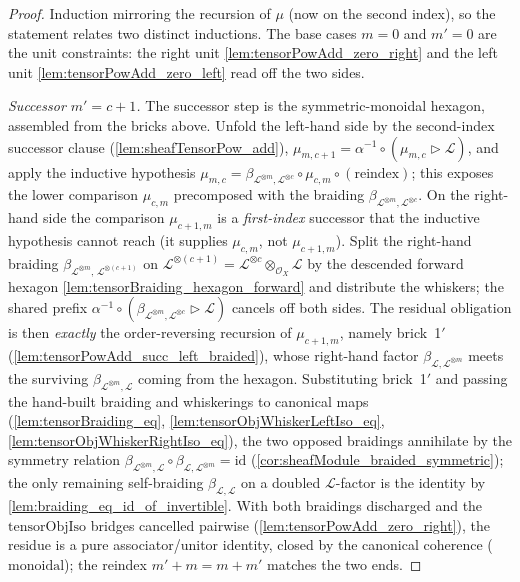\begin{proof}
    \leanok
  Induction mirroring the recursion of \(\mu\) (now on the second index), so the
  statement relates two distinct inductions. The base cases \(m = 0\) and
  \(m' = 0\) are the unit constraints: the right unit
  \cref{lem:tensorPowAdd_zero_right} and the left unit
  \cref{lem:tensorPowAdd_zero_left} read off the two sides.

  \emph{Successor \(m' = c+1\).} The successor step is the symmetric-monoidal
  hexagon, assembled from the bricks above. Unfold the left-hand side by the
  second-index successor clause (\cref{lem:sheafTensorPow_add}), \(\mu_{m,c+1} =
  \alpha^{-1}\circ(\mu_{m,c}\rhd\mathcal{L})\), and apply the inductive hypothesis
  \(\mu_{m,c} = \beta_{\mathcal{L}^{\otimes m},\mathcal{L}^{\otimes c}}\circ
  \mu_{c,m}\circ(\text{reindex})\); this exposes the lower comparison
  \(\mu_{c,m}\) precomposed with the braiding
  \(\beta_{\mathcal{L}^{\otimes m},\mathcal{L}^{\otimes c}}\). On the right-hand
  side the comparison \(\mu_{c+1,m}\) is a \emph{first-index} successor that the
  inductive hypothesis cannot reach (it supplies \(\mu_{c,m}\), not
  \(\mu_{c+1,m}\)). Split the right-hand braiding
  \(\beta_{\mathcal{L}^{\otimes m},\,\mathcal{L}^{\otimes(c+1)}}\) on
  \(\mathcal{L}^{\otimes(c+1)}=\mathcal{L}^{\otimes c}\otimes_{\mathcal{O}_X}
  \mathcal{L}\) by the descended forward hexagon
  \cref{lem:tensorBraiding_hexagon_forward} and distribute the whiskers; the
  shared prefix \(\alpha^{-1}\circ(\beta_{\mathcal{L}^{\otimes m},
  \mathcal{L}^{\otimes c}}\rhd\mathcal{L})\) cancels off both sides. The residual
  obligation is then \emph{exactly} the order-reversing recursion of
  \(\mu_{c+1,m}\), namely brick~1\('\) (\cref{lem:tensorPowAdd_succ_left_braided}),
  whose right-hand factor \(\beta_{\mathcal{L},\mathcal{L}^{\otimes m}}\) meets the
  surviving \(\beta_{\mathcal{L}^{\otimes m},\mathcal{L}}\) coming from the
  hexagon. Substituting brick~1\('\) and passing the hand-built braiding and
  whiskerings to canonical maps (\cref{lem:tensorBraiding_eq},
  \cref{lem:tensorObjWhiskerLeftIso_eq},
  \cref{lem:tensorObjWhiskerRightIso_eq}), the two opposed braidings annihilate by
  the symmetry relation \(\beta_{\mathcal{L}^{\otimes m},\mathcal{L}}\circ
  \beta_{\mathcal{L},\mathcal{L}^{\otimes m}} = \mathrm{id}\)
  (\cref{cor:sheafModule_braided_symmetric}); the only remaining self-braiding
  \(\beta_{\mathcal{L},\mathcal{L}}\) on a doubled \(\mathcal{L}\)-factor is the
  identity by \cref{lem:braiding_eq_id_of_invertible}. With both braidings
  discharged and the \(\mathrm{tensorObjIso}\) bridges cancelled pairwise
  (\cref{lem:tensorPowAdd_zero_right}), the residue is a pure
  associator/unitor identity, closed by the canonical coherence
  (\(\mathrm{monoidal}\)); the reindex \(m'+m=m+m'\) matches the two ends.
\end{proof}


